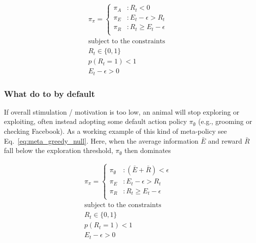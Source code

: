 \documentclass[9pt,twocolumn,twoside]{pnas-new}
\begin{document}
\begin{equation} \label{eq:meta_greedy_aver}
    \begin{split}
        \pi_{\pi} = 
        \begin{cases}
            \pi_A & : R_t < 0 \\
            \pi_E & : E_t - \epsilon > R_t \\
            \pi_R & : R_t \geq E_t - \epsilon \\
        \end{cases}\\
        \text{subject to the constraints}\\
        R_t \in \{0, 1\}\\ 
        p(R_t = 1) < 1\\
        E_t - \epsilon > 0
    \end{split}
\end{equation}


\subsubsection*{What do to by default}
If overall stimulation / motivation is too low, an animal will stop exploring or exploiting, often instead adopting some default action policy $\pi_{\emptyset}$ (e.g., grooming or checking Facebook). As a working example of this kind of meta-policy see Eq.~\ref{eq:meta_greedy_null}. Here, when the average information $\bar E$ and reward $\bar R$ fall below the exploration threshold, $\pi_{\emptyset}$ then dominates 

\begin{equation} \label{eq:meta_greedy_null}
    \begin{split}
        \pi_{\pi} = 
        \begin{cases}
            \pi_{\emptyset} & : (\bar E + \bar R) < \epsilon \\
            \pi_E & : E_t - \epsilon > R_t \\
            \pi_R & : R_t \geq E_t - \epsilon \\
        \end{cases}\\
        \text{subject to the constraints}\\
        R_t \in \{0, 1\}\\ 
        p(R_t = 1) < 1\\
        E_t - \epsilon > 0
    \end{split}
\end{equation}
\end{document}
